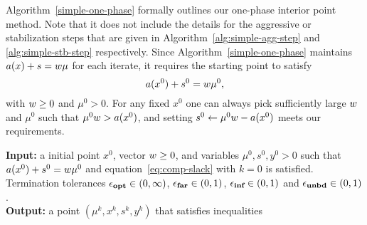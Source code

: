 \documentclass{article}
\begin{document}
Algorithm~\ref{simple-one-phase} formally outlines our one-phase interior point method. Note that it does not include the details for the aggressive or stabilization steps that are given in Algorithm~\ref{alg:simple-agg-step} and \ref{alg:simple-stb-step} respectively. Since Algorithm~\ref{simple-one-phase} maintains $a(x) + s = w \mu$ for each iterate, it requires the starting point to satisfy
$$
a(x^{0}) + s^{0} = w \mu^{0},
$$
with $w \ge 0$ and $\mu^{0} > 0$. For any fixed $x^{0}$ one can always pick sufficiently large $w$ and $\mu^{0}$ such that $\mu^{0} w > a(x^{0})$, and setting $s^{0} \gets  \mu^{0}  w- a(x^{0})$ meets our requirements.

\newcommand{\superlinear}[1]{}

\begin{algorithm}[H]
\textbf{Input:} a initial point $x^{0}$, vector $w \ge 0$, and variables $\mu^0, s^{0}, y^{0} > 0$  such that $a(x^{0}) + s^{0} = w \mu^{0}$ and equation~\eqref{eq:comp-slack} with $k=0$ is satisfied. Termination tolerances $\epsilon_{\textbf{opt}} \in (0,\infty)$, $\epsilon_{\textbf{far}} \in (0,1)$, $\epsilon_{\textbf{inf}} \in (0,1)$ and $\epsilon_{\textbf{unbd}} \in (0,1)$. \\
\textbf{Output:} a point $(\mu^k, x^k, s^k, y^k)$ that satisfies inequalities \termination{} \\


\end{algorithm}
\end{document}
